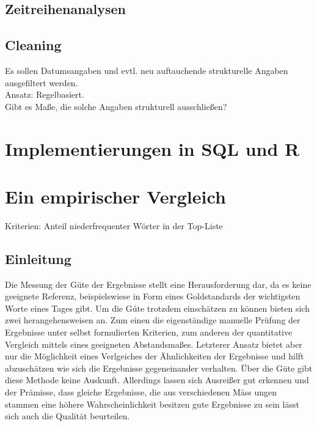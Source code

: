 \section{Zeitreihenanalysen}

\section{Cleaning}
Es sollen Datumsangaben und evtl. neu auftauchende strukturelle Angaben ausgefiltert werden.\\
Ansatz: Regelbasiert.\\
Gibt es Maße, die solche Angaben strukturell ausschließen?



\chapter{Implementierungen in SQL und R}



\chapter{Ein empirischer Vergleich}
 
Kriterien: Anteil niederfrequenter Wörter in der Top-Liste\\
\section{Einleitung}
Die Messung der G\"ute der Ergebnisse stellt eine Herausforderung dar, da es keine geeignete Referenz, beispielswiese in Form eines Goldstandards der wichtigsten Worte eines Tages gibt. Um die G\'ute trotzdem einsch\"atzen zu k\"onnen bieten sich zwei herangehensweisen an. Zum einen die eigenst\"andige manuelle Pr\"ufung der Ergebnisse unter selbst formulierten Kriterien, zum anderen der quantitative Vergleich mittels eines geeigneten Abstandsma\ss es. Letzterer Ansatz bietet aber nur die M\"oglichkeit eines Verlgeiches der \"Ahnlichkeiten der Ergebnisse und hilft abzusch\"atzen wie sich die Ergebnisse gegeneinander verhalten. \"Uber die G\"ute gibt diese Methode keine Auskunft. Allerdings lassen sich Ausrei\ss er gut erkennen und der Pr\"amisse, dass gleiche Ergebnisse, die aus verschiedenen M\"ass ungen stammen eine h\"ohere Wahrscheinlichkeit besitzen gute Ergebnisse zu sein l\"asst sich auch die Qualit\"at beurteilen.
